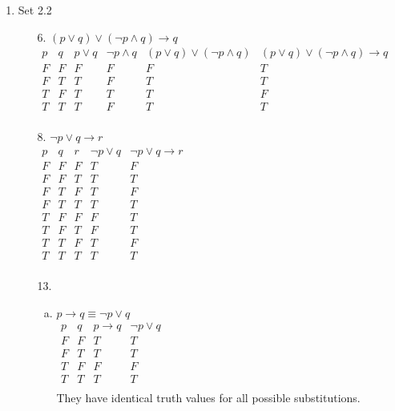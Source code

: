 \documentclass[letterpaper]{article}
\begin{document}
\begin{enumerate}
\begin{enumerate}
			\item Set 2.2
			\begin{itemize}
				\item [6.]
				$\left( p \vee q \right) \vee \left( \neg p \wedge q \right) \rightarrow q$ \\
				$\begin{array}{c|c|c|c|c|c}
					p & q & p \vee q & \neg p \wedge q & \left( p \vee q \right) \vee \left( \neg p \wedge q \right) &\left( p \vee q \right) \vee \left( \neg p \wedge q \right) \rightarrow q \\ \hline
					F & F & F & F & F & T \\ \hline
					F & T & T & F & T & T \\ \hline
					T & F & T & T & T & F \\ \hline
					T & T & T & F & T & T \\
				\end{array}$ \\
				
				\item [8.]
				$\neg p \vee q \rightarrow r$ \\
				$\begin{array}{c|c|c|c|c}
					p & q & r & \neg p \vee q & \neg p \vee q \rightarrow r \\ \hline
					F & F & F & T & F \\ \hline
					F & F & T & T & T \\ \hline
					F & T & F & T & F \\ \hline
					F & T & T & T & T \\ \hline
					T & F & F & F & T \\ \hline
					T & F & T & F & T \\ \hline
					T & T & F & T & F \\ \hline
					T & T & T & T & T \\ 
				\end{array}$ \\
			
				\item [13.] \quad
				\begin{enumerate}[(a)]
					\item
					$p \rightarrow q \equiv \neg p \vee q$ \\
					$\begin{array}{c|c|c|c}
						p & q & p \rightarrow q & \neg p \vee q \\ \hline
						F & F & T & T \\ \hline
						F & T & T & T \\ \hline
						T & F & F & F \\ \hline
						T & T & T & T \\
					\end{array}$ \\
					They have identical truth values for all possible substitutions.
					

\end{enumerate}
\end{itemize}
\end{enumerate}
\end{enumerate}
\end{document}
